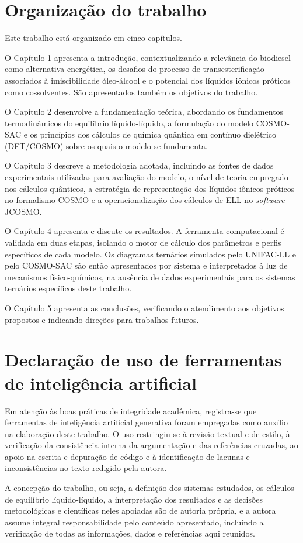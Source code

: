 \section{Organização do trabalho}
\label{sec:organizacao}

Este trabalho está organizado em cinco capítulos.

O Capítulo 1 apresenta a introdução, contextualizando a relevância do biodiesel como alternativa energética, os desafios do processo de transesterificação associados à imiscibilidade óleo-álcool e o potencial dos líquidos iônicos próticos como cossolventes. São apresentados também os objetivos do trabalho.

O Capítulo 2 desenvolve a fundamentação teórica, abordando os fundamentos termodinâmicos do equilíbrio líquido-líquido, a formulação do modelo COSMO-SAC e os princípios dos cálculos de química quântica em contínuo dielétrico (DFT/COSMO) sobre os quais o modelo se fundamenta.

O Capítulo 3 descreve a metodologia adotada, incluindo as fontes de dados experimentais utilizadas para avaliação do modelo, o nível de teoria empregado nos cálculos quânticos, a estratégia de representação dos líquidos iônicos próticos no formalismo COSMO e a operacionalização dos cálculos de ELL no \textit{software} JCOSMO.

O Capítulo 4 apresenta e discute os resultados. A ferramenta computacional é validada em duas etapas, isolando o motor de cálculo dos parâmetros e perfis específicos de cada modelo. Os diagramas ternários simulados pelo UNIFAC-LL e pelo COSMO-SAC são então apresentados por sistema e interpretados à luz de mecanismos físico-químicos, na ausência de dados experimentais para os sistemas ternários específicos deste trabalho.

O Capítulo 5 apresenta as conclusões, verificando o atendimento aos objetivos propostos e indicando direções para trabalhos futuros.

\section{Declaração de uso de ferramentas de inteligência artificial}
\label{sec:declaracao_ia}

Em atenção às boas práticas de integridade acadêmica, registra-se que ferramentas de inteligência artificial generativa foram empregadas como auxílio na elaboração deste trabalho. O uso restringiu-se à revisão textual e de estilo, à verificação da consistência interna da argumentação e das referências cruzadas, ao apoio na escrita e depuração de código e à identificação de lacunas e inconsistências no texto redigido pela autora.

A concepção do trabalho, ou seja, a definição dos sistemas estudados, os cálculos de equilíbrio líquido-líquido, a interpretação dos resultados e as decisões metodológicas e científicas neles apoiadas são de autoria própria, e a autora assume integral responsabilidade pelo conteúdo apresentado, incluindo a verificação de todas as informações, dados e referências aqui reunidos.
